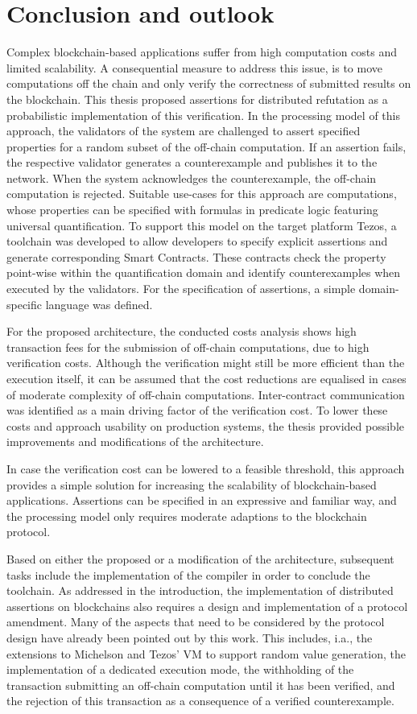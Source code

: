 \chapter{Conclusion and outlook}\label{chap:conclusion}
Complex blockchain-based applications suffer from high computation costs and limited scalability. A consequential measure to address this issue, is to move computations off the chain and only verify the correctness of submitted results on the blockchain. This thesis  proposed assertions for distributed refutation as a probabilistic implementation of this verification. In the processing model of this approach, the validators of the system are challenged to assert specified properties for a random subset of the off-chain computation. If an assertion fails, the respective validator generates a counterexample and publishes it to the network. When the system acknowledges the counterexample, the off-chain computation is rejected. Suitable use-cases for this approach are computations, whose properties can be specified with formulas in predicate logic featuring universal quantification. To support this model on the target platform Tezos, a toolchain was developed to allow developers to specify explicit assertions and generate corresponding Smart Contracts. These contracts check the property point-wise within the quantification domain and identify counterexamples when executed by the validators. For the specification of assertions, a simple domain-specific language was defined.

For the proposed architecture, the conducted costs analysis shows high transaction fees for the submission of off-chain computations,  due to high verification costs. Although the verification might still be more efficient than the execution itself, it can be assumed that the cost reductions are equalised in cases of moderate complexity of off-chain computations. Inter-contract communication was identified as a main driving factor of the verification cost. To lower these costs and approach usability on production systems, the thesis provided possible improvements and modifications of the architecture.

In case the verification cost can be lowered to a feasible threshold, this approach provides a simple solution for increasing the scalability of blockchain-based applications. Assertions can be specified in an expressive and familiar way, and the processing model only requires moderate adaptions to the blockchain protocol.

Based on either the proposed or a modification of the architecture, subsequent tasks include the implementation of the compiler in order to conclude the toolchain. As addressed in the introduction, the implementation of distributed assertions on blockchains also requires a design and implementation of a protocol amendment. Many of the aspects that need to be considered by the protocol design have already been pointed out by this work. This includes, i.a., the extensions to Michelson and Tezos' VM to support random value generation, the implementation of a dedicated execution mode, the withholding of the transaction submitting an off-chain computation until it has been verified, and the rejection of this transaction as a consequence of a verified counterexample. 

